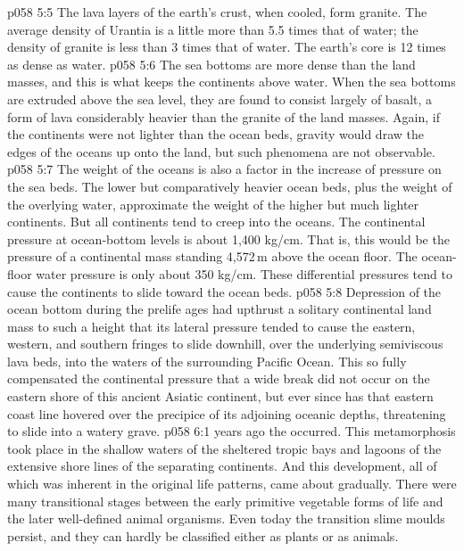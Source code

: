 \vs p058 5:5 \pc The lava layers of the earth’s crust, when cooled, form granite. The average density of Urantia is a little more than 5.5 times that of water; the density of granite is less than 3 times that of water. The earth’s core is 12 times as dense as water.
\vs p058 5:6 The sea bottoms are more dense than the land masses, and this is what keeps the continents above water. When the sea bottoms are extruded above the sea level, they are found to consist largely of basalt, a form of lava considerably heavier than the granite of the land masses. Again, if the continents were not lighter than the ocean beds, gravity would draw the edges of the oceans up onto the land, but such phenomena are not observable.
\vs p058 5:7 The weight of the oceans is also a factor in the increase of pressure on the sea beds. The lower but comparatively heavier ocean beds, plus the weight of the overlying water, approximate the weight of the higher but much lighter continents. But all continents tend to creep into the oceans. The continental pressure at ocean\hyp{}bottom levels is about 1,400 kg/cm. That is, this would be the pressure of a continental mass standing 4,572\,m above the ocean floor. The ocean\hyp{}floor water pressure is only about 350 kg/cm. These differential pressures tend to cause the continents to slide toward the ocean beds.
\vs p058 5:8 Depression of the ocean bottom during the prelife ages had upthrust a solitary continental land mass to such a height that its lateral pressure tended to cause the eastern, western, and southern fringes to slide downhill, over the underlying semiviscous lava beds, into the waters of the surrounding Pacific Ocean. This so fully compensated the continental pressure that a wide break did not occur on the eastern shore of this ancient Asiatic continent, but ever since has that eastern coast line hovered over the precipice of its adjoining oceanic depths, threatening to slide into a watery grave.
\vs p058 6:1  years ago the  occurred. This metamorphosis took place in the shallow waters of the sheltered tropic bays and lagoons of the extensive shore lines of the separating continents. And this development, all of which was inherent in the original life patterns, came about gradually. There were many transitional stages between the early primitive vegetable forms of life and the later well\hyp{}defined animal organisms. Even today the transition slime moulds persist, and they can hardly be classified either as plants or as animals.
